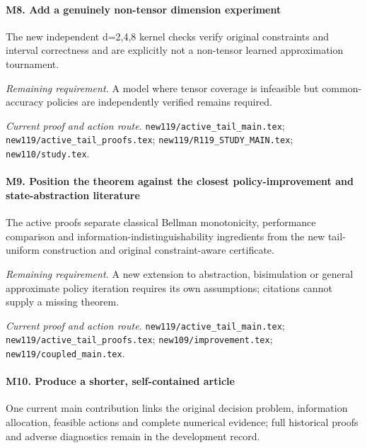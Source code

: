 \paragraph{M8. Add a genuinely non-tensor dimension experiment}

The new independent d=2,4,8 kernel checks verify original constraints and interval correctness and are explicitly not a non-tensor learned approximation tournament.

\par\emph{Remaining requirement.} A model where tensor coverage is infeasible but common-accuracy policies are independently verified remains required.

\par\emph{Current proof and action route.} \nolinkurl{new119/active_tail_main.tex}; \nolinkurl{new119/active_tail_proofs.tex}; \nolinkurl{new119/R119_STUDY_MAIN.tex}; \nolinkurl{new110/study.tex}.

\paragraph{M9. Position the theorem against the closest policy-improvement and state-abstraction literature}

The active proofs separate classical Bellman monotonicity, performance comparison and information-indistinguishability ingredients from the new tail-uniform construction and original constraint-aware certificate.

\par\emph{Remaining requirement.} A new extension to abstraction, bisimulation or general approximate policy iteration requires its own assumptions; citations cannot supply a missing theorem.

\par\emph{Current proof and action route.} \nolinkurl{new119/active_tail_main.tex}; \nolinkurl{new119/active_tail_proofs.tex}; \nolinkurl{new109/improvement.tex}; \nolinkurl{new119/coupled_main.tex}.

\paragraph{M10. Produce a shorter, self-contained article}

One current main contribution links the original decision problem, information allocation, feasible actions and complete numerical evidence; full historical proofs and adverse diagnostics remain in the development record.


